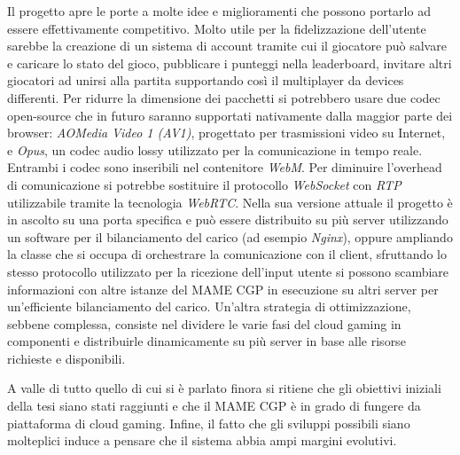 Il progetto apre le porte a molte idee e miglioramenti che possono portarlo ad essere effettivamente competitivo. Molto utile per la fidelizzazione dell'utente sarebbe la creazione di un sistema di account tramite cui il giocatore può salvare e caricare lo stato del gioco, pubblicare i punteggi nella leaderboard, invitare altri giocatori ad unirsi alla partita supportando così il multiplayer da devices differenti. Per ridurre la dimensione dei pacchetti si potrebbero usare due codec open-source che in futuro saranno supportati nativamente dalla maggior parte dei browser: \textit{AOMedia Video 1 (AV1)}, progettato per trasmissioni video su Internet, e \textit{Opus}, un codec audio lossy utilizzato per la comunicazione in tempo reale. Entrambi i codec sono inseribili nel contenitore \textit{WebM}. Per diminuire l'overhead di comunicazione si potrebbe sostituire il protocollo \textit{WebSocket} con \textit{RTP} utilizzabile tramite la tecnologia \textit{WebRTC}. Nella sua versione attuale il progetto è in ascolto su una porta specifica e può essere distribuito su più server utilizzando un software per il bilanciamento del carico (ad esempio \textit{Nginx}), oppure ampliando la classe che si occupa di orchestrare la comunicazione con il client, sfruttando lo stesso protocollo utilizzato per la ricezione dell'input utente si possono scambiare informazioni con altre istanze del MAME CGP in esecuzione su altri server per un'efficiente bilanciamento del carico. Un'altra strategia di ottimizzazione, sebbene complessa, consiste nel dividere le varie fasi del cloud gaming in componenti e distribuirle dinamicamente su più server in base alle risorse richieste e disponibili.

A valle di tutto quello di cui si è parlato finora si ritiene che gli obiettivi iniziali della tesi siano stati raggiunti e che il MAME CGP è in grado di fungere da piattaforma di cloud gaming. Infine, il fatto che gli sviluppi possibili siano molteplici induce a pensare che il sistema abbia ampi margini evolutivi.